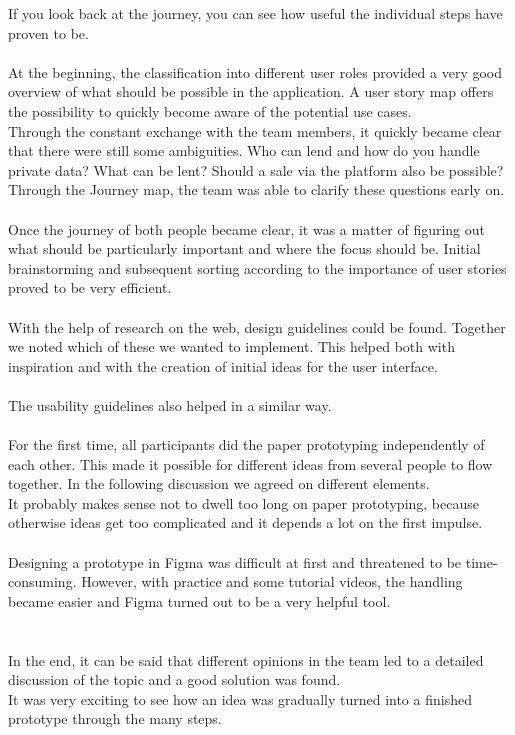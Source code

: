 If you look back at the journey, you can see how useful the individual steps have proven to be.\\
\\
At the beginning, the classification into different user roles provided a very good overview of what should be possible in the application. A user story map offers the possibility to quickly become aware of the potential use cases. \\
Through the constant exchange with the team members, it quickly became clear that there were still some ambiguities. Who can lend and how do you handle private data? What can be lent? Should a sale via the platform also be possible? \\
Through the Journey map, the team was able to clarify these questions early on.\\
\\
Once the journey of both people became clear, it was a matter of figuring out what should be particularly important and where the focus should be. Initial brainstorming and subsequent sorting according to the importance of user stories proved to be very efficient.\\
\\
With the help of research on the web, design guidelines could be found. Together we noted which of these we wanted to implement. This helped both with inspiration and with the creation of initial ideas for the user interface.\\
\\
The usability guidelines also helped in a similar way.\\
\\
For the first time, all participants did the paper prototyping independently of each other. This made it possible for different ideas from several people to flow together. In the following discussion we agreed on different elements. \\
It probably makes sense not to dwell too long on paper prototyping, because otherwise ideas get too complicated and it depends a lot on the first impulse.\\
\\
Designing a prototype in Figma was difficult at first and threatened to be time-consuming. However, with practice and some tutorial videos, the handling became easier and Figma turned out to be a very helpful tool.\\
\\
\\
In the end, it can be said that different opinions in the team led to a detailed discussion of the topic and a good solution was found. \\
It was very exciting to see how an idea was gradually turned into a finished prototype through the many steps.




